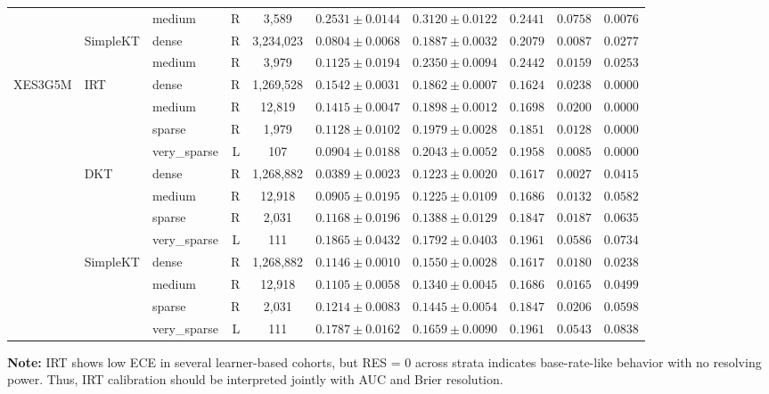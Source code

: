 \begin{tableorg}[htbp]
{\begin{tabular}{lllrcccccc}
 &  & medium & R & 3,589 & $0.2531 \pm 0.0144$ & $0.3120 \pm 0.0122$ & $0.2441$ & $0.0758$ & $0.0076$ \\
 & SimpleKT & dense & R & 3,234,023 & $0.0804 \pm 0.0068$ & $0.1887 \pm 0.0032$ & $0.2079$ & $0.0087$ & $0.0277$ \\
 &  & medium & R & 3,979 & $0.1125 \pm 0.0194$ & $0.2350 \pm 0.0094$ & $0.2442$ & $0.0159$ & $0.0253$ \\
\midrule
XES3G5M & IRT & dense & R & 1,269,528 & $0.1542 \pm 0.0031$ & $0.1862 \pm 0.0007$ & $0.1624$ & $0.0238$ & $0.0000$ \\
 &  & medium & R & 12,819 & $0.1415 \pm 0.0047$ & $0.1898 \pm 0.0012$ & $0.1698$ & $0.0200$ & $0.0000$ \\
 &  & sparse & R & 1,979 & $0.1128 \pm 0.0102$ & $0.1979 \pm 0.0028$ & $0.1851$ & $0.0128$ & $0.0000$ \\
 &  & very\_sparse & L & 107 & $0.0904 \pm 0.0188$ & $0.2043 \pm 0.0052$ & $0.1958$ & $0.0085$ & $0.0000$ \\
 & DKT & dense & R & 1,268,882 & $0.0389 \pm 0.0023$ & $0.1223 \pm 0.0020$ & $0.1617$ & $0.0027$ & $0.0415$ \\
 &  & medium & R & 12,918 & $0.0905 \pm 0.0195$ & $0.1225 \pm 0.0109$ & $0.1686$ & $0.0132$ & $0.0582$ \\
 &  & sparse & R & 2,031 & $0.1168 \pm 0.0196$ & $0.1388 \pm 0.0129$ & $0.1847$ & $0.0187$ & $0.0635$ \\
 &  & very\_sparse & L & 111 & $0.1865 \pm 0.0432$ & $0.1792 \pm 0.0403$ & $0.1961$ & $0.0586$ & $0.0734$ \\
 & SimpleKT & dense & R & 1,268,882 & $0.1146 \pm 0.0010$ & $0.1550 \pm 0.0028$ & $0.1617$ & $0.0180$ & $0.0238$ \\
 &  & medium & R & 12,918 & $0.1105 \pm 0.0058$ & $0.1340 \pm 0.0045$ & $0.1686$ & $0.0165$ & $0.0499$ \\
 &  & sparse & R & 2,031 & $0.1214 \pm 0.0083$ & $0.1445 \pm 0.0054$ & $0.1847$ & $0.0206$ & $0.0598$ \\
 &  & very\_sparse & L & 111 & $0.1787 \pm 0.0162$ & $0.1659 \pm 0.0090$ & $0.1961$ & $0.0543$ & $0.0838$ \\
\bottomrule

\end{tabular}
}

\vspace{1ex}
\noindent\footnotesize \textbf{Note:} IRT shows low ECE in several learner-based cohorts, but RES = 0 across strata indicates base-rate-like behavior with no resolving power. Thus, IRT calibration should be interpreted jointly with AUC and Brier resolution.


\end{tableorg}

